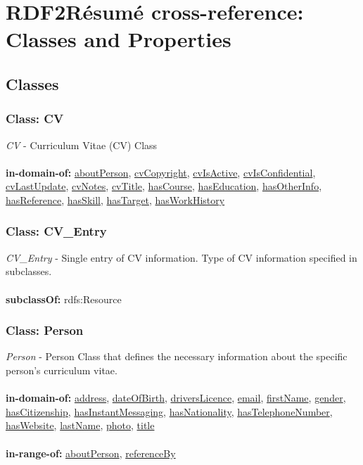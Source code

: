 \documentclass[a4paper,12pt]{article}
\numberwithin{equation}{section}
\begin{document}
\section{RDF2R{\'e}sum{\'e} cross-reference: Classes and Properties}

\subsection{Classes}
\subsubsection{Class: CV}\hypertarget{CV}{}
\textit{CV} - Curriculum Vitae (CV) Class
\\\\
\textbf{in-domain-of:} \hyperlink{aboutPerson}{aboutPerson}, \hyperlink{cvCopyright}{cvCopyright}, \hyperlink{cvIsActive}{cvIsActive}, \hyperlink{cvIsConfidential}{cvIsConfidential}, \hyperlink{cvLastUpdate}{cvLastUpdate},  \hyperlink{cvNotes}{cvNotes}, \hyperlink{cvTitle}{cvTitle}, \hyperlink{hasCourse}{hasCourse}, \hyperlink{hasEducation}{hasEducation}, \hyperlink{hasOtherInfo}{hasOtherInfo}, \hyperlink{hasReference}{hasReference}, \hyperlink{hasSkill}{hasSkill}, \hyperlink{hasTarget}{hasTarget}, \hyperlink{hasWorkHistory}{hasWorkHistory}

\subsubsection{Class: CV\_Entry}\hypertarget{CV_Entry}{}
\textit{CV\_Entry} - Single entry of CV information. Type of CV information specified in subclasses.
\\\\
\textbf{subclassOf:} rdfs:Resource

\subsubsection{Class: Person}\hypertarget{Person}{}
\textit{Person} - Person Class that defines the necessary information about the specific person's curriculum vitae.
\\\\
\textbf{in-domain-of:} \hyperlink{address}{address}, \hyperlink{dateOfBirth}{dateOfBirth}, \hyperlink{driversLicence}{driversLicence}, \hyperlink{email}{email}, \hyperlink{firstName}{firstName},  \hyperlink{gender}{gender}, \hyperlink{hasCitizenship}{hasCitizenship}, \hyperlink{hasInstantMessaging}{hasInstantMessaging},  \hyperlink{hasNationality}{hasNationality}, \hyperlink{hasTelephoneNumber}{hasTelephoneNumber}, \hyperlink{hasWebsite}{hasWebsite}, \hyperlink{lastName}{lastName}, \hyperlink{photo}{photo}, \hyperlink{title}{title}
\\\\
\textbf{in-range-of:} \hyperlink{aboutPerson}{aboutPerson}, \hyperlink{referenceBy}{referenceBy}
\end{document}
